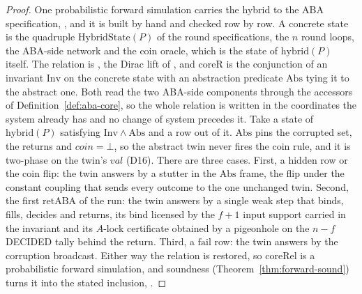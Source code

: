 \begin{proof}\leanok
  One probabilistic forward simulation carries the hybrid to the ABA specification, , and it is built by hand and checked row by row.
  A concrete state is the quadruple $\mathrm{HybridState}(P)$ of the round specifications, the $n$ round loops, the ABA-side network and the coin oracle, which is the state of $\mathrm{hybrid}(P)$ itself.
  The relation is , the Dirac lift of , and $\mathrm{coreR}$ is the conjunction of an invariant $\mathrm{Inv}$ on the concrete state with an abstraction predicate $\mathrm{Abs}$ tying it to the abstract one.
  Both read the two ABA-side components through the accessors of Definition~\ref{def:aba-core}, so the whole relation is written in the coordinates the system already has and no change of system precedes it.
  Take a state of $\mathrm{hybrid}(P)$ satisfying $\mathrm{Inv} \wedge \mathrm{Abs}$ and a row out of it.
  $\mathrm{Abs}$ pins the corrupted set, the returns and $coin = \bot$, so the abstract twin never fires the coin rule, and it is two-phase on the twin's $val$ (D16).
  There are three cases.
  First, a hidden row or the coin flip: the twin answers by a stutter in the $\mathrm{Abs}$ frame, the flip under the constant coupling that sends every outcome to the one unchanged twin.
  Second, the first $\mathrm{retABA}$ of the run: the twin answers by a single weak step that binds, fills, decides and returns, its bind licensed by the $f{+}1$ input support carried in the invariant and its $A$-lock certificate obtained by a pigeonhole on the $n-f$ DECIDED tally behind the return.
  Third, a $\mathrm{fail}$ row: the twin answers by the corruption broadcast.
  Either way the relation is restored, so $\mathrm{coreRel}$ is a probabilistic forward simulation, and soundness (Theorem~\ref{thm:forward-sound}) turns it into the stated inclusion, .
\end{proof}
